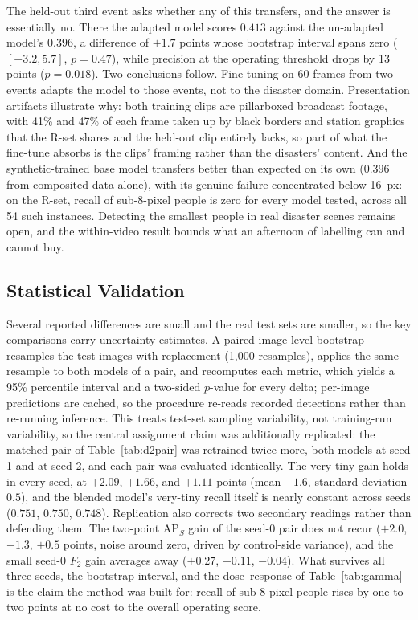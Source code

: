 The held-out third event asks whether any of this transfers, and the answer is
essentially no. There the adapted model scores $0.413$ against the un-adapted
model's $0.396$, a difference of $+1.7$ points whose bootstrap interval spans
zero ($[-3.2, 5.7]$, $p=0.47$), while precision at the operating threshold
drops by 13 points ($p=0.018$). Two conclusions follow. Fine-tuning on 60
frames from two events adapts the model to those events, not to the disaster
domain. Presentation artifacts illustrate why: both training clips are
pillarboxed broadcast footage, with 41\% and 47\% of each frame taken up by
black borders and station graphics that the R-set shares and the held-out
clip entirely lacks, so part of what the fine-tune absorbs is the clips'
framing rather than the disasters' content. And the synthetic-trained base model transfers better than expected on
its own ($0.396$ from composited data alone), with its genuine failure
concentrated below 16~px: on the R-set, recall of sub-8-pixel people is zero
for every model tested, across all 54 such instances. Detecting the smallest
people in real disaster scenes remains open, and the within-video result
bounds what an afternoon of labelling can and cannot buy.

\subsection{Statistical Validation}
\label{sec:stats}
Several reported differences are small and the real test sets are smaller, so
the key comparisons carry uncertainty estimates. A paired image-level
bootstrap resamples the test images with replacement (1{,}000 resamples),
applies the same resample to both models of a pair, and recomputes each
metric, which yields a 95\% percentile interval and a two-sided $p$-value for
every delta; per-image predictions are cached, so the procedure re-reads
recorded detections rather than re-running inference. This treats test-set
sampling variability, not training-run variability, so the central assignment
claim was additionally replicated: the matched pair of Table~\ref{tab:d2pair}
was retrained twice more, both models at seed 1 and at seed 2, and each pair
was evaluated identically. The very-tiny gain holds in every seed, at
$+2.09$, $+1.66$, and $+1.11$ points (mean $+1.6$, standard deviation
$0.5$), and the blended model's very-tiny recall itself is nearly constant
across seeds ($0.751$, $0.750$, $0.748$). Replication also corrects two
secondary readings rather than defending them. The two-point $\mathrm{AP}_S$
gain of the seed-0 pair does not recur ($+2.0$, $-1.3$, $+0.5$ points,
noise around zero, driven by control-side variance), and the small seed-0
$F_2$ gain averages away ($+0.27$, $-0.11$, $-0.04$). What survives all
three seeds, the bootstrap interval, and the dose--response of
Table~\ref{tab:gamma} is the claim the method was built for: recall of
sub-8-pixel people rises by one to two points at no cost to the overall
operating score.

